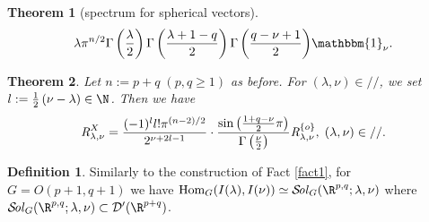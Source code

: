 \documentclass[portrait,final,paperwidth=90cm,paperheight=120cm,fontscale=0.3]{baposter}
\newtheorem{theorem}{Theorem}
\newcommand{\Hom}{\mbox{\normalfont Hom}}
\newcommand{\Sol}{\mathcal{S}\!{\it ol}}
\theoremstyle{definition}
\newtheorem{definition}{Definition}
\newcommand{\OpR}{\mbox{\it R}}
\begin{document}
\begin{poster}
{\begin{theorem}[spectrum for spherical vectors]
\[{{\lambda}\pi^{n / 2}}{\Gamma \left( \frac{\lambda}{2} \right)
\Gamma \left(  \frac{\lambda + 1-q}{2} \right) \Gamma \left(
\frac{q - \nu + 1}{2} \right)} \mathbbm{1}_{\nu}. \]
\end{theorem}
}
{
\begin{theorem}
	Let $n:=p+q\;(p,q\ge1)$ as before.
	For $(\lambda,\nu)\in//$, we set $l:=\frac{1}{2}\left( \nu-\lambda \right)\in\N$. Then we have
  \[\OpR_{\lambda,\nu}^X  = \frac{ (- 1)^l l!\pi^{(n - 2) / 2} 
		}{2^{ \nu + 2 l-1}}\cdot  \frac{\sin\left( \frac{1+q-\nu}{2}\pi \right)}{\Gamma\left( \frac{\nu}{2} \right)}
     \OpR_{\lambda,\nu}^{ \left\{ o \right\} },\;(\lambda,\nu)\in//. \]
	\end{theorem}
}
{
	\begin{definition}
		Similarly to the construction of Fact \ref{fact1}, for $G=O(p+1,q+1)$ we have $\Hom_G(I(\lambda),I(\nu))\simeq\Sol_G(\R^{p,q};\lambda,\nu)$
		where $\Sol_G(\R^{p,q};\lambda,\nu)\subset\mathcal{D}'(\R^{p+q})$.


\end{definition}}
\end{poster}
\end{document}
